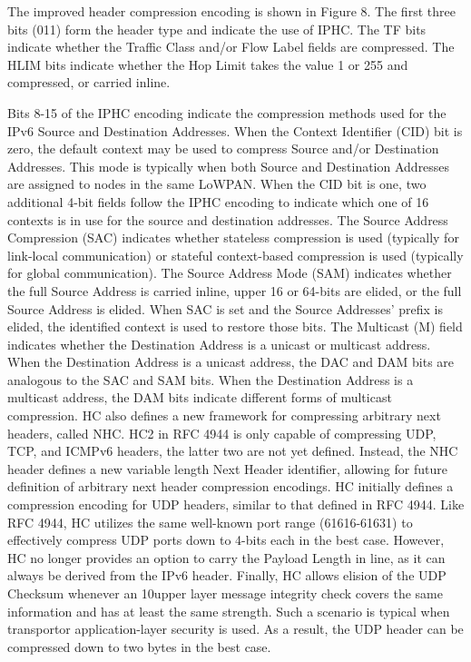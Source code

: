 The improved header compression encoding is shown in Figure 8.
The first three bits (011) form the header type and indicate the use of IPHC.
The TF bits indicate whether the Traffic Class and/or Flow Label fields are compressed.
The HLIM bits indicate whether the Hop Limit takes the value 1 or 255 and compressed,
	or carried inline.

Bits 8-15 of the IPHC encoding indicate the compression methods used for the IPv6 Source and Destination Addresses.
When the Context Identifier (CID) bit is zero,
	the default context may be used to compress Source and/or Destination Addresses.
This mode is typically when both Source and Destination Addresses are assigned to nodes in the same LoWPAN.
When the CID bit is one,
	two additional 4-bit fields follow the IPHC encoding to indicate which one of 16 contexts is in use for the source and destination addresses.
The Source Address Compression (SAC) indicates whether stateless compression is used (typically for link-local communication) or stateful context-based compression is used (typically for global communication).
The Source Address Mode (SAM) indicates whether the full Source Address is carried inline,
	upper 16 or 64-bits are elided,
	or the full Source Address is elided.
When SAC is set and the Source Addresses’ prefix is elided,
	the identified context is used to restore those bits.
The Multicast (M) field indicates whether the Destination Address is a unicast or multicast address.
When the Destination Address is a unicast address,
	the DAC and DAM bits are analogous to the SAC and SAM bits.
When the Destination Address is a multicast address,
	the DAM bits indicate different forms of multicast compression.
HC also defines a new framework for compressing arbitrary next headers,
	called NHC.
HC2 in RFC 4944 is only capable of compressing UDP,
	TCP,
	and ICMPv6 headers,
	the latter two are not yet defined.
Instead,
	the NHC header defines a new variable length Next Header identifier,
	allowing for future definition of arbitrary next header compression encodings.
HC initially defines a compression encoding for UDP headers,
	similar to that defined in RFC 4944.
Like RFC 4944,
	HC utilizes the same well-known port range (61616-61631) to effectively compress UDP ports down to 4-bits each in the best case.
However,
	HC no longer provides an option to carry the Payload Length in line,
	as it can always be derived from the IPv6 header.
Finally,
	HC allows elision of the UDP Checksum whenever an 10upper layer message integrity check covers the same information and has at least the same strength.
Such a scenario is typical when transportor application-layer security is used.
As a result,
	the UDP header can be compressed down to two bytes in the best case.


